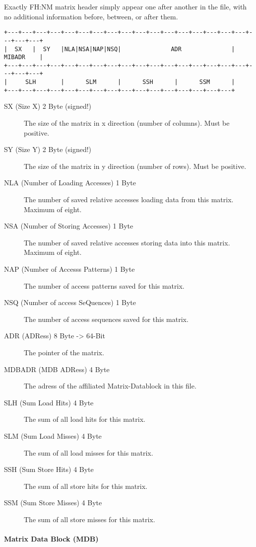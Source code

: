 Exactly FH:NM matrix header simply appear one after another in the file, with no additional information 
before, between, or after them.
\begin{verbatim}
+---+---+---+---+---+---+---+---+---+---+---+---+---+---+---+---+---+---+---+---+
|  SX   |  SY   |NLA|NSA|NAP|NSQ|              ADR              |     MIBADR    |
+---+---+---+---+---+---+---+---+---+---+---+---+---+---+---+---+---+---+---+---+
|     SLH       |      SLM      |      SSH      |      SSM      |
+---+---+---+---+---+---+---+---+---+---+---+---+---+---+---+---+
\end{verbatim}
\begin{description}
\item[SX (Size X) 2 Byte (signed!)]
The size of the matrix in x direction (number of columns). Must be positive.
\item[SY (Size Y) 2 Byte (signed!)]
The size of the matrix in y direction (number of rows). Must be positive.
\item[NLA (Number of Loading Accesses) 1 Byte]
The number of saved relative accesses loading data from this matrix. Maximum of eight.
\item[NSA (Number of Storing Accesses) 1 Byte]
The number of saved relative accesses storing data into this matrix. Maximum of eight.
\item[NAP (Number of Accesss Patterns) 1 Byte]
The number of access patterns saved for this matrix.
\item[NSQ (Number of access SeQuences) 1 Byte]
The number of access sequences saved for this matrix.
\item[ADR (ADRess) 8 Byte -> 64-Bit]
The pointer of the matrix.
\item[MDBADR (MDB ADRess) 4 Byte]
The adress of the affiliated Matrix-Datablock in this file.
\item[SLH (Sum Load Hits) 4 Byte]
The sum of all load hits for this matrix.
\item[SLM (Sum Load Misses) 4 Byte]
The sum of all load misses for this matrix.
\item[SSH (Sum Store Hits) 4 Byte]
The sum of all store hits for this matrix.
\item[SSM (Sum Store Misses) 4 Byte]
The sum of all store misses for this matrix.
\end{description}

\paragraph{Matrix Data Block (MDB)}

